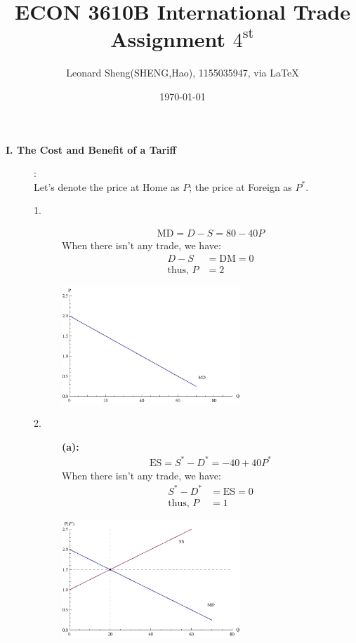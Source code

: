 \documentclass{article}
\begin{document}
\title{ECON 3610B International Trade \\Assignment $4^{\text{st}}$}
\author{{\normalsize Leonard Sheng(SHENG,Hao), 1155035947, via \LaTeX}}
\date{\today}

\maketitle
\baselineskip 0.6cm

\begin{description}
    \item[{\bf I. The Cost and Benefit of a Tariff}]:\\
    Let's denote the price at Home as $P$; the price at Foreign as $P^*$.
    \begin{description}
      \item[1.]
      \begin{align}
        \text{MD}=D-S=80-40P
      \end{align}
      When there isn't any trade, we have:
      \begin{align}
        D-S&=\text{DM}=0\\
        \text{thus,   }P&= 2
      \end{align}
      \begin{center}
                 \includegraphics[angle=0, width=0.6\textwidth]{ECON3610BA4P1}
      \end{center}
    \item[2.]
      {\bf (a):}
      \begin{align}
        \text{ES}=S^*-D^*=-40+40P^*
      \end{align}
      When there isn't any trade, we have:
      \begin{align}
       S^*-D^*&=\text{ES}=0\\
        \text{thus,   }P&= 1
      \end{align}
      \begin{center}
                 \includegraphics[angle=0, width=0.6\textwidth]{ECON3610BA4P2}

\end{center}
\end{description}
\end{description}
\end{document}

